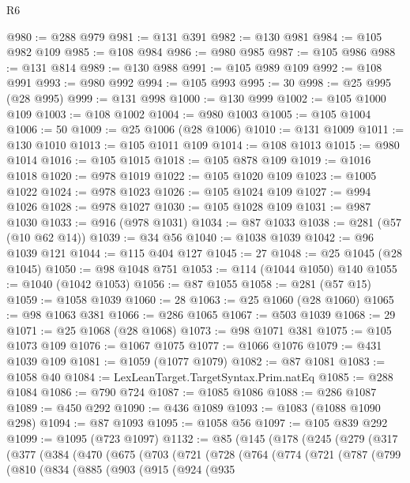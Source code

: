 \begin{lexlean}{R6}
\begin{coremodule}
@980 := @288 @979
@981 := @131 @391
@982 := @130 @981
@984 := @105 @982 @109
@985 := @108 @984
@986 := @980 @985
@987 := @105 @986
@988 := @131 @814
@989 := @130 @988
@991 := @105 @989 @109
@992 := @108 @991
@993 := @980 @992
@994 := @105 @993
@995 := 30
@998 := @25 @995 (@28 @995)
@999 := @131 @998
@1000 := @130 @999
@1002 := @105 @1000 @109
@1003 := @108 @1002
@1004 := @980 @1003
@1005 := @105 @1004
@1006 := 50
@1009 := @25 @1006 (@28 @1006)
@1010 := @131 @1009
@1011 := @130 @1010
@1013 := @105 @1011 @109
@1014 := @108 @1013
@1015 := @980 @1014
@1016 := @105 @1015
@1018 := @105 @878 @109
@1019 := @1016 @1018
@1020 := @978 @1019
@1022 := @105 @1020 @109
@1023 := @1005 @1022
@1024 := @978 @1023
@1026 := @105 @1024 @109
@1027 := @994 @1026
@1028 := @978 @1027
@1030 := @105 @1028 @109
@1031 := @987 @1030
@1033 := @916 (@978 @1031)
@1034 := @87 @1033
@1038 := @281 (@57 (@10 @62 @14))
@1039 := @34 @56
@1040 := @1038 @1039
@1042 := @96 @1039 @121
@1044 := @115 @404 @127
@1045 := 27
@1048 := @25 @1045 (@28 @1045)
@1050 := @98 @1048 @751
@1053 := @114 (@1044 @1050) @140
@1055 := @1040 (@1042 @1053)
@1056 := @87 @1055
@1058 := @281 (@57 @15)
@1059 := @1058 @1039
@1060 := 28
@1063 := @25 @1060 (@28 @1060)
@1065 := @98 @1063 @381
@1066 := @286 @1065
@1067 := @503 @1039
@1068 := 29
@1071 := @25 @1068 (@28 @1068)
@1073 := @98 @1071 @381
@1075 := @105 @1073 @109
@1076 := @1067 @1075
@1077 := @1066 @1076
@1079 := @431 @1039 @109
@1081 := @1059 (@1077 @1079)
@1082 := @87 @1081
@1083 := @1058 @40
@1084 := LexLeanTarget.TargetSyntax.Prim.natEq
@1085 := @288 @1084
@1086 := @790 @724
@1087 := @1085 @1086
@1088 := @286 @1087
@1089 := @450 @292
@1090 := @436 @1089
@1093 := @1083 (@1088 @1090 @298)
@1094 := @87 @1093
@1095 := @1058 @56
@1097 := @105 @839 @292
@1099 := @1095 (@723 @1097)
@1132 := @85
    (@145
      (@178
        (@245
          (@279
            (@317
              (@377
                (@384
                  (@470
                    (@675
                      (@703
                        (@721
                          (@728
                            (@764
                              (@774
                                (@721
                                  (@787
                                    (@799
                                      (@810
                                        (@834
                                          (@885
                                            (@903
                                              (@915
                                                (@924
                                                  (@935

\end{coremodule}
\end{lexlean}
